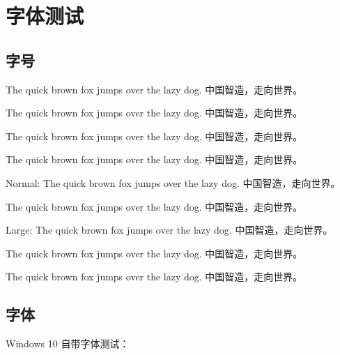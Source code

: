 
\chapter{字体测试}

\section{字号}

{\tiny The quick brown fox jumps over the lazy dog. 中国智造，走向世界。}

{\scriptsize The quick brown fox jumps over the lazy dog. 中国智造，走向世界。}

{\footnotesize The quick brown fox jumps over the lazy dog. 中国智造，走向世界。}

{\small The quick brown fox jumps over the lazy dog. 中国智造，走向世界。}

{\normalsize Normal: The quick brown fox jumps over the lazy dog. 中国智造，走向世界。}

{\large The quick brown fox jumps over the lazy dog. 中国智造，走向世界。}

{\Large Large: The quick brown fox jumps over the lazy dog. 中国智造，走向世界。}

{\LARGE The quick brown fox jumps over the lazy dog. 中国智造，走向世界。}

{\Huge The quick brown fox jumps over the lazy dog. 中国智造，走向世界。}

\section{字体}

Windows 10 自带字体测试：








